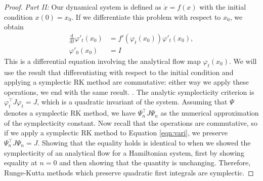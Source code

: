 \documentclass{report}
\theoremstyle{exampstyle} \newtheorem{example}[theorem]{Example}
\theoremstyle{exampstyle} \newtheorem{remark}[theorem]{Remark}
\theoremstyle{exampstyle} \newtheorem{definition}[theorem]{Definition}
\theoremstyle{exampstyle} \newtheorem{lemma}[theorem]{Lemma}
\begin{document}
\begin{proof}
\textit{Part II:}
Our dynamical system is defined as $\dot{x} = f(x)$ with the initial condition $x(0) = x_0$.
If we differentiate this problem with respect to $x_0$, we obtain
\begin{equation}
\begin{aligned}
	\frac{\mathrm{d}}{\mathrm{d}t} \varphi'_t(x_0) &= f'(\varphi_t(x_0))\varphi'_t(x_0), \\
	\varphi'_0(x_0) &= I
\end{aligned}
\label{eqn:vari}
\end{equation}
This is a differential equation involving the analytical flow map $\varphi_t(x_0)$.
We will use the result that differentiating with respect to the initial condition and applying a symplectic RK method are commutative:
either way we apply these operations, we end with the same result. \cite{}.
The analytic symplecticity criterion is $\varphi_t^\intercal J \varphi_t = J$, which is a quadratic invariant of the system.
Assuming that $\Psi$ denotes a symplectic RK method, we have $\Psi_n^\intercal J \Psi_n$ as the numerical approximation of the symplecticity constant.
Now recall that the operations are commutative, so if we apply a symplectic RK method to Equation \ref{eqn:vari},
we preserve $\Psi_n^\intercal J \Psi_n = J$.
Showing that the equality holds is identical to when we showed the symplecticity of an analytical flow for a Hamiltonian system,
first by showing equality at $n=0$ and then showing that the quantity is unchanging.
Therefore, Runge-Kutta methods which preserve quadratic first integrals are symplectic. \end{proof}

\end{document}
